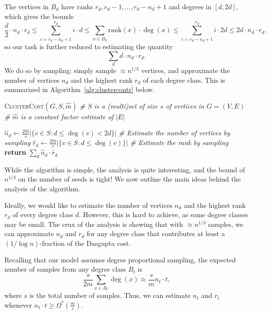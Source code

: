 \documentclass[letterpaper,11pt]{article}
\newcommand{\rank}{\mathrm{rank}}
\theoremstyle{plain}
\theoremstyle{definition}
\theoremstyle{remark}
\newcommand{\return}{\textbf{return }}
\begin{document}
The vertices in $B_d$ have ranks $r_d, r_{d}-1,\dots, r_d -n_d+1$ and degrees in $[d,2d]$, which gives the bounds
\begin{equation}\label{eqn:rdnd:tech}
    \frac{d}{2} \cdot n_d \cdot r_d \leq \sum_{i = r_d -n_d+1}^{r_d} i \cdot d \leq \sum_{x \in B_d} \rank(x) \cdot \deg(x) \leq \sum_{i = r_d -n_d+1}^{r_d} i \cdot 2d \leq 2 d \cdot n_d \cdot r_d,
\end{equation}
so our task is further reduced to estimating the quantity 
\begin{equation}\label{eqn:estquantity}
    \sum_{d} d \cdot n_d \cdot r_d. 
\end{equation}
We do so by sampling: simply sample $\approx n^{1/3}$ vertices, and approximate the number of vertices $n_d$ and the highest rank $r_d$ of each degree class. This is summarized in Algorithm~\ref{alg:clustercontr} below. 
\begin{algorithm}[H]
	\caption{\textsc{ClusterCost$(G, S,\hat{m})$}
		\newline \textit{\# $S$ is a (multi)set of size $s$ of vertices in $G=(V, E)$ }
		\newline \textit{\#	$\hat{m}$ is a constant factor estimate of $|E|$} }
	\label{alg:clustercontr}
	\begin{algorithmic}[1]
\STATE $\hat{n}_d \gets \frac{2\hat{m}}{s}|\{ v \in S: d \leq \deg(v) < 2d\}|$ \qquad \quad \textit{\# Estimate the number of vertices by sampling}
            \STATE $\hat{r}_d \gets \frac{2\hat{m}}{s}|\{ v \in S: d \leq \deg(v) \}|$ \qquad \qquad \quad  \textit{ \# Estimate the rank by sampling}
		\ENDFOR
		\STATE \return  $\sum_d \hat{n}_d \cdot \hat{r}_d$
	\end{algorithmic}
\end{algorithm}
While the algorithm is simple, the analysis is quite interesting, and the bound of $n^{1/3}$ on the number of seeds is tight! We now outline the main ideas behind the analysis of the algorithm.

Ideally, we would like to estimate the number of vertices $n_d$ and the highest rank $r_d$ of every degree class $d$. However, this is hard to achieve, as some degree classes may be small. The crux of the analysis is showing that with $\approx n^{1/3}$ samples, we can approximate $n_d$ and $r_d$ for any degree class that contributes at least a $(1/\log n)$-fraction of the Dasgupta cost. 

 Recalling that our model assumes degree proportional sampling, the expected number of samples from any degree class $B_t$ is
\[\frac{s}{2m} \sum_{x \in B_t} \deg (x)  \approx \frac{s}{m} n_t \cdot t, \] where $s$ is the total number of samples. 
Thus, we can estimate $n_t$ and $r_t$ whenever
$n_t \cdot t \geq \Omega^*\left(\frac{m}{s}\right).$
\end{document}
